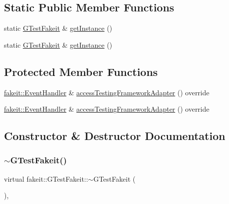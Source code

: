 \subsection*{Static Public Member Functions}
\begin{DoxyCompactItemize}
\item 
static \mbox{\hyperlink{classfakeit_1_1GTestFakeit}{G\+Test\+Fakeit}} \& \mbox{\hyperlink{classfakeit_1_1GTestFakeit_a8e543c089507b2e31839cf5d6140d01b}{get\+Instance}} ()
\item 
static \mbox{\hyperlink{classfakeit_1_1GTestFakeit}{G\+Test\+Fakeit}} \& \mbox{\hyperlink{classfakeit_1_1GTestFakeit_a8e543c089507b2e31839cf5d6140d01b}{get\+Instance}} ()
\end{DoxyCompactItemize}
\subsection*{Protected Member Functions}
\begin{DoxyCompactItemize}
\item 
\mbox{\hyperlink{structfakeit_1_1EventHandler}{fakeit\+::\+Event\+Handler}} \& \mbox{\hyperlink{classfakeit_1_1GTestFakeit_aab1288d4764301be458751d47164ee55}{access\+Testing\+Framework\+Adapter}} () override
\item 
\mbox{\hyperlink{structfakeit_1_1EventHandler}{fakeit\+::\+Event\+Handler}} \& \mbox{\hyperlink{classfakeit_1_1GTestFakeit_aab1288d4764301be458751d47164ee55}{access\+Testing\+Framework\+Adapter}} () override
\end{DoxyCompactItemize}


\subsection{Constructor \& Destructor Documentation}
\mbox{\label{classfakeit_1_1GTestFakeit_adac8418f661e952a4610c8304f2d42e1}} 
\subsubsection{\texorpdfstring{$\sim$GTestFakeit()}{~GTestFakeit()}\hspace{0.1cm}{\footnotesize\ttfamily [1/2]}}
{\footnotesize\ttfamily virtual fakeit\+::\+G\+Test\+Fakeit\+::$\sim$\+G\+Test\+Fakeit (\begin{DoxyParamCaption}{ }\end{DoxyParamCaption})\hspace{0.3cm}{\ttfamily [virtual]}, {\ttfamily [default]}}

